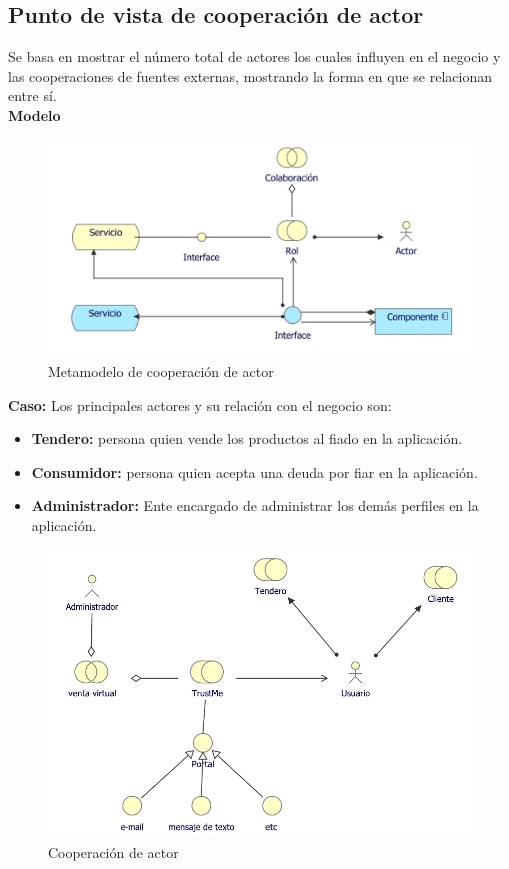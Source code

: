 	\subsection{Punto de vista de cooperación de actor}
	{Se  basa en mostrar el número total de actores los cuales influyen en el negocio y las cooperaciones de fuentes externas, mostrando la forma en que se relacionan entre sí.\\
		
		\textbf{Modelo}\\
		\begin{figure}[H]
			\centering
			\includegraphics[width=0.8\linewidth]{development/cooperacionactor.png}
			\caption{Metamodelo de cooperación de actor}
		\end{figure}
		
		\textbf{Caso:} Los principales actores y su relación con el negocio son:
		
		\begin{itemize}
			\item \textbf{Tendero:} persona quien vende los productos al fiado en la aplicación.
			
			\item \textbf{Consumidor:} persona quien acepta una deuda por fiar en la aplicación.
			
			\item \textbf{Administrador:} Ente encargado de administrar los demás perfiles en la aplicación.
			
		\end{itemize}
		
		\begin{figure}[H]
			\centering
			\includegraphics[width=0.8\linewidth]{development/cooperacionactor.pdf}
			\caption{Cooperación de actor}
		\end{figure}
	}
	
